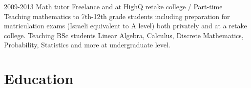 \documentclass[]{friggeri-cv}
\begin{document}
\begin{entrylist}
  \entry
  {2009-2013}
  {Math tutor}
  {Freelance and at \href{https://www.high-q.co.il/}{HighQ retake college} / Part-time}
  {
    Teaching mathematics to 7th-12th grade students including preparation for matriculation exams (Israeli equivalent to A level) both privately and at a retake college.
    Teaching BSc students Linear Algebra, Calculus, Discrete Mathematics, Probability, Statistics and more at undergraduate level.
  }

\end{entrylist}

\clearpage


\section{Education}
\end{document}
